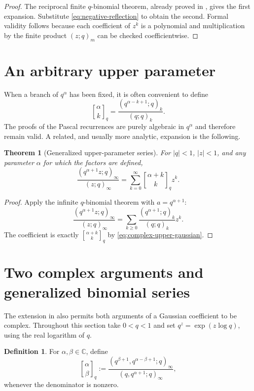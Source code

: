 \documentclass[11pt,oneside,openany]{book}
\newtheorem{theorem}{Theorem}[chapter]
\theoremstyle{definition}
\newtheorem{definition}[definition]{Definition}
\theoremstyle{remark}
\newcommand{\Qbinom}[3]{\genfrac{[}{]}{0pt}{}{#1}{#2}_{#3}}
\newcommand{\C}{\mathbb C}
\newcommand{\abs}[1]{\lvert #1\rvert}
\begin{document}
\begin{proof}
The reciprocal finite $q$-binomial theorem, already proved in , gives the first expansion.  Substitute \eqref{eq:negative-reflection} to obtain the second.  Formal validity follows because each coefficient of $z^k$ is a polynomial and multiplication by the finite product $(z;q)_m$ can be checked coefficientwise.
\end{proof}

\section{An arbitrary upper parameter}

When a branch of $q^\alpha$ has been fixed, it is often convenient to define
\[
 \Qbinom{\alpha}{k}q
 =\frac{(q^{\alpha-k+1};q)_k}{(q;q)_k}.
 \tag{17.6}\label{eq:complex-upper-gaussian}
\]
The proofs of the Pascal recurrences are purely algebraic in $q^\alpha$ and therefore remain valid.  A related, and usually more analytic, expansion is the following.

\begin{theorem}[Generalized upper-parameter series]\label{thm:upper-parameter-series}
For $\abs q<1$, $\abs z<1$, and any parameter $\alpha$ for which the factors are defined,
\[
 \frac{(q^{\alpha+1}z;q)_\infty}{(z;q)_\infty}
 =\sum_{k=0}^{\infty}
   \Qbinom{\alpha+k}{k}q z^k.
 \tag{17.7}\label{eq:upper-parameter-series}
\]
\end{theorem}

\begin{proof}
Apply the infinite $q$-binomial theorem with $a=q^{\alpha+1}$:
\[
 \frac{(q^{\alpha+1}z;q)_\infty}{(z;q)_\infty}
 =\sum_{k\ge0}\frac{(q^{\alpha+1};q)_k}{(q;q)_k}z^k.
\]
The coefficient is exactly $\Qbinom{\alpha+k}{k}q$ by \eqref{eq:complex-upper-gaussian}.
\end{proof}

\section{Two complex arguments and generalized binomial series}

The extension in  also permits both arguments of a Gaussian coefficient to be complex.  Throughout this section take $0<q<1$ and set $q^z=\exp(z\log q)$, using the real logarithm of $q$.

\begin{definition}\label{def:complex-gaussian}
For $\alpha,\beta\in\C$, define
\[
 \genfrac{[}{]}{0pt}{}{\alpha}{\beta}_q
 :=\frac{(q^{\beta+1},q^{\alpha-\beta+1};q)_\infty}
 {(q,q^{\alpha+1};q)_\infty},
 \tag{17.8}\label{eq:complex-gaussian}
\]
whenever the denominator is nonzero.
\end{definition}
\end{document}
